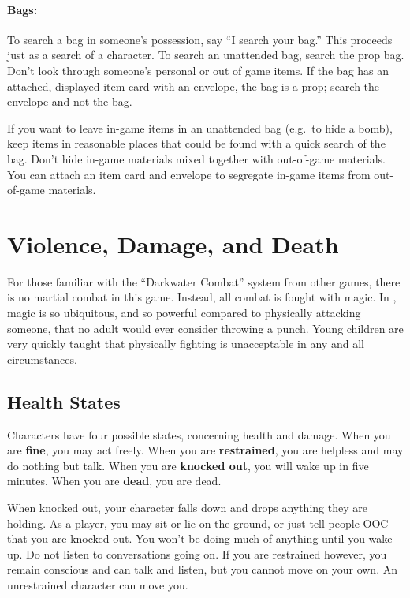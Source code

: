 \documentclass[sheet]{GL2020}
\begin{document}
\paragraph{Bags:} To search a bag in someone's possession, say ``I search your bag.''  This proceeds just as a search of a character. To search an unattended bag, search the prop bag. Don't look through someone's personal or out of game items. If the bag has an attached, displayed item card with an envelope, the bag is a prop; search the envelope and not the bag.

If you want to leave in-game items in an unattended bag (e.g.\ to hide a bomb), keep items in reasonable places that could be found with a quick search of the bag. Don't hide in-game materials mixed together with out-of-game materials. You can attach an item card and envelope to segregate in-game items from out-of-game materials.

\section{Violence, Damage, and Death}
For those familiar with the ``Darkwater Combat'' system from other games, there is no martial combat in this game. Instead, all combat is fought with magic. In \pEarth{}, magic is so ubiquitous, and so powerful compared to physically attacking someone, that no adult would ever consider throwing a punch. Young children are very quickly taught that physically fighting is unacceptable in any and all circumstances.

\subsection{Health States}

Characters have four possible states, concerning health and damage. When you are {\bf fine}, you may act freely. When you are {\bf restrained}, you are helpless and may do nothing but talk.  When you are {\bf knocked out}, you will wake up in five minutes. When you are {\bf dead}, you are dead.

When knocked out, your character falls down and drops anything they are holding. As a player, you may sit or lie on the ground, or just tell people OOC that you are knocked out. You won't be doing much of anything until you wake up. Do not listen to conversations going on. If you are restrained however, you remain conscious and can talk and listen, but you cannot move on your own. An unrestrained character can move you.
\end{document}
